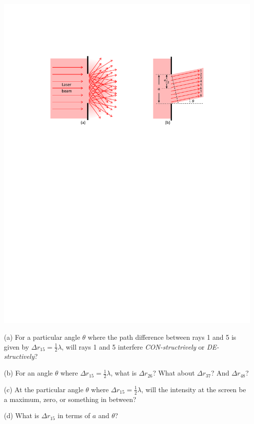 \answerspace{0.2in}
\begin{center}
\includegraphics{diffraction_of_light/one_slit_rays_color.pdf}
\end{center}
\answerspace{0.2in}

(a) For a particular angle $\theta$ where the path difference between rays 1 and 5 is given by $\Delta r_{15}=\frac{1}{2}\lambda$, will rays 1 and 5 interfere \textit{CON-structrively} or \textit{DE-structively}?
\answerspace{0.4in}

(b) For an angle $\theta$ where $\Delta r_{15}=\frac{1}{2}\lambda$, what is $\Delta r_{26}$?  What about $\Delta r_{37}$? And $\Delta r_{48}$?
\answerspace{0.5in}

(c) At the particular angle $\theta$ where $\Delta r_{15}=\frac{1}{2}\lambda$, will the intensity at the screen be a maximum, zero, or something in between?
\answerspace{0.4in}

(d) What is $\Delta r_{15}$ in terms of $a$ and $\theta$?
\answerspace{0.4in}

